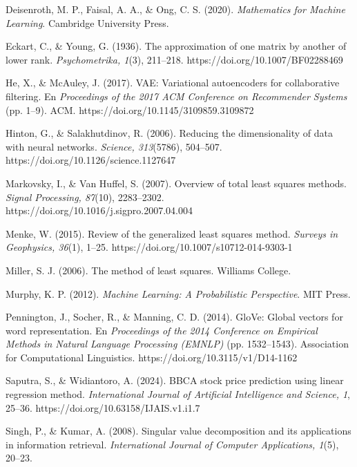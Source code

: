 \documentclass[12pt]{article}
\begin{document}
        \hangindent=0.5in  Deisenroth, M. P., Faisal, A. A., \& Ong, C. S. (2020). \textit{Mathematics for Machine Learning}. Cambridge University Press.\par
        \hangindent=0.5in  Eckart, C., \& Young, G. (1936). The approximation of one matrix by another of lower rank. \textit{Psychometrika, 1}(3), 211–218. https://doi.org/10.1007/BF02288469\par
        \hangindent=0.5in  He, X., \& McAuley, J. (2017). VAE: Variational autoencoders for collaborative filtering. En \textit{Proceedings of the 2017 ACM Conference on Recommender Systems} (pp. 1–9). ACM. https://doi.org/10.1145/3109859.3109872\par
        \hangindent=0.5in  Hinton, G., \& Salakhutdinov, R. (2006). Reducing the dimensionality of data with neural networks. \textit{Science, 313}(5786), 504–507. https://doi.org/10.1126/science.1127647\par
        \hangindent=0.5in  Markovsky, I., \& Van Huffel, S. (2007). Overview of total least squares methods. \textit{Signal Processing, 87}(10), 2283–2302. https://doi.org/10.1016/j.sigpro.2007.04.004\par
        \hangindent=0.5in  Menke, W. (2015). Review of the generalized least squares method. \textit{Surveys in Geophysics, 36}(1), 1–25. https://doi.org/10.1007/s10712-014-9303-1\par
        \hangindent=0.5in  Miller, S. J. (2006). The method of least squares. Williams College.\par
        \hangindent=0.5in  Murphy, K. P. (2012). \textit{Machine Learning: A Probabilistic Perspective}. MIT Press.\par
        \hangindent=0.5in  Pennington, J., Socher, R., \& Manning, C. D. (2014). GloVe: Global vectors for word representation. En \textit{Proceedings of the 2014 Conference on Empirical Methods in Natural Language Processing (EMNLP)} (pp. 1532–1543). Association for Computational Linguistics. https://doi.org/10.3115/v1/D14-1162\par
        \hangindent=0.5in  Saputra, S., \& Widiantoro, A. (2024). BBCA stock price prediction using linear regression method. \textit{International Journal of Artificial Intelligence and Science, 1}, 25–36. https://doi.org/10.63158/IJAIS.v1.i1.7\par
        \hangindent=0.5in  Singh, P., \& Kumar, A. (2008). Singular value decomposition and its applications in information retrieval. \textit{International Journal of Computer Applications, 1}(5), 20–23.\par
\end{document}

